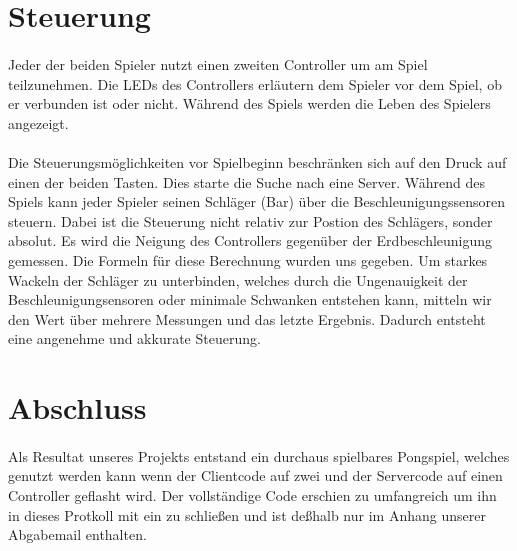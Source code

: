 \section*{Steuerung}

\paragraph*{}
Jeder der beiden Spieler nutzt einen zweiten Controller um am Spiel teilzunehmen. Die LEDs des Controllers erläutern dem Spieler vor dem Spiel, ob er verbunden ist oder nicht. Während des Spiels werden die Leben des Spielers angezeigt. 

\paragraph*{}
Die Steuerungsmöglichkeiten vor Spielbeginn beschränken sich auf den Druck auf einen der beiden Tasten. Dies starte die Suche nach eine Server. Während des Spiels kann jeder Spieler seinen Schläger (Bar) über die Beschleunigungssensoren steuern. Dabei ist die Steuerung nicht relativ zur Postion des Schlägers, sonder absolut. Es wird die Neigung des Controllers gegenüber der Erdbeschleunigung gemessen. Die Formeln für diese Berechnung wurden uns gegeben. Um starkes Wackeln der Schläger zu unterbinden, welches durch die Ungenauigkeit der Beschleunigungsensoren oder minimale Schwanken entstehen kann, mitteln wir den Wert über mehrere Messungen und das letzte Ergebnis. Dadurch entsteht eine angenehme und akkurate Steuerung.

\section*{Abschluss}

\paragraph*{}
Als Resultat unseres Projekts entstand ein durchaus spielbares Pongspiel, welches genutzt werden kann wenn der Clientcode auf zwei und der Servercode auf einen Controller geflasht wird. Der vollständige Code erschien zu umfangreich um ihn in dieses Protkoll mit ein zu schließen und ist deßhalb nur im Anhang unserer Abgabemail enthalten.


